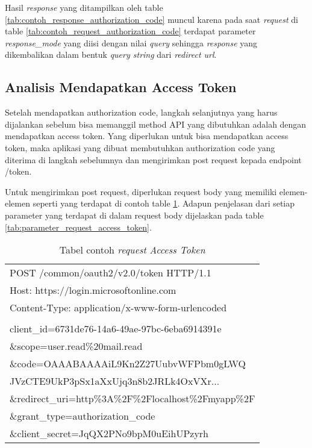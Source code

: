 Hasil \textit{response} yang ditampilkan oleh table \ref{tab:contoh_response_authorization_code} muncul karena pada saat \textit{request} di table \ref{tab:contoh_request_authorization_code} terdapat parameter \textit{response\_mode} yang diisi dengan nilai \textit{query} sehingga \textit{response} yang dikembalikan dalam bentuk \textit{query string} dari \textit{redirect url}. 

\subsection{Analisis Mendapatkan Access Token}
\label{analisis_access_token}

Setelah mendapatkan authorization code, langkah selanjutnya yang harus dijalankan sebelum bisa memanggil method API yang dibutuhkan adalah dengan mendapatkan access token. Yang diperlukan untuk bisa mendapatkan access token, maka aplikasi yang dibuat membutuhkan authorization code yang diterima di langkah sebelumnya dan mengirimkan post request kepada endpoint /token. 

Untuk mengirimkan post request, diperlukan request body yang memiliki elemen-elemen seperti yang terdapat di contoh table \ref{tab:contoh_request_access_token}. Adapun penjelasan dari setiap parameter yang terdapat di dalam request body dijelaskan pada table \ref{tab:parameter_request_access_token}. 

\begin{table}[H]
	\centering 
	\caption{Tabel contoh \textit{request} \textit{Access Token}}
	\label{tab:contoh_request_access_token}
	\begin{tabular}{|p{12cm}|}
	\toprule
	POST /common/oauth2/v2.0/token HTTP/1.1\\
Host: https://login.microsoftonline.com\\
Content-Type: application/x-www-form-urlencoded\\
\\
client\_id=6731de76-14a6-49ae-97bc-6eba6914391e\\
\&scope=user.read\%20mail.read\\
\&code=OAAABAAAAiL9Kn2Z27UubvWFPbm0gLWQ\\
JVzCTE9UkP3pSx1aXxUjq3n8b2JRLk4OxVXr...\\
\&redirect\_uri=http\%3A\%2F\%2Flocalhost\%2Fmyapp\%2F\\
\&grant\_type=authorization\_code\\
\&client\_secret=JqQX2PNo9bpM0uEihUPzyrh \\ 
	\bottomrule
	\end{tabular}  
\end{table}

